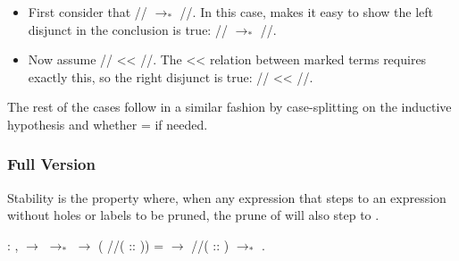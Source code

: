 \documentclass[12pt]{report}
\begin{document}
\begin{itemize}
\begin{itemize}

\item  First consider that //
    $\to_*$ //. In this case,
         makes it easy to show
        the left disjunct in the conclusion is true:
         
        // $\to_*$
         
        //.



\item  Now assume // <<
    //. The << relation
        between marked terms requires exactly this, so the right
        disjunct is true:  
        // <<
         
        //.

\end{itemize}

\end{itemize}


The rest of the cases follow in a similar fashion by case-splitting
on the inductive hypothesis and whether 
=  if needed.




\subsubsection{Full Version}



Stability is the property where, when any expression 
that steps to an expression  without holes or labels to
be pruned, the prune of  will also step to
.

\begin{coqdoccode}
\coqdocemptyline
\coqdocindent{1.00em}
  : \coqdockw{\ensuremath{\forall}}   ,\coqdoceol
\coqdocindent{2.00em}
  \ensuremath{\rightarrow}\coqdoceol
\coqdocindent{2.00em}
 $\to_*$  \ensuremath{\rightarrow}\coqdoceol
\coqdocindent{2.00em}
(  //\coqdocvar{\_}( :: )) =  \ensuremath{\rightarrow}\coqdoceol
\coqdocindent{2.00em}
  //\coqdocvar{\_}( :: ) $\to_*$ .\coqdoceol
\coqdocemptyline

\end{coqdoccode}
\end{document}
